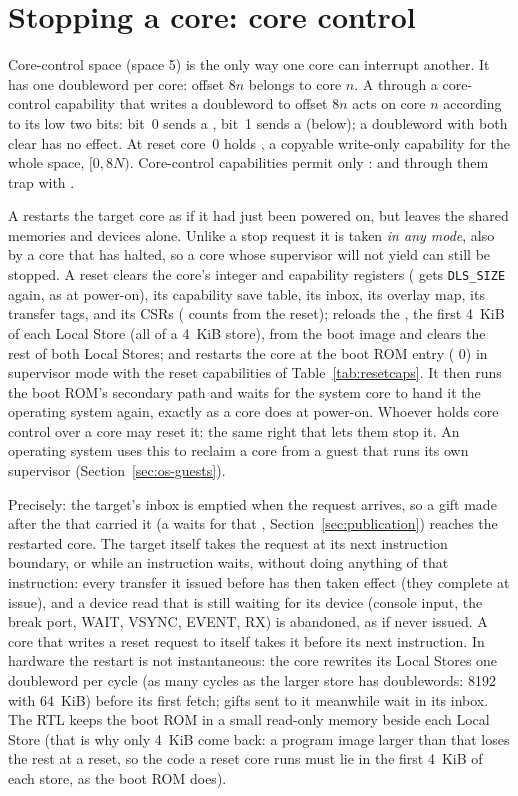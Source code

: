 \section{Stopping a core: core control}\label{sec:corectl}

Core-control space (space 5) is the only way one core can interrupt another. It has one doubleword per
core: offset $8n$ belongs to core $n$. A  through a core-control capability that writes a
doubleword to offset $8n$ acts on core $n$ according to its low two bits: bit~0 sends a , bit~1 sends a  (below); a doubleword with both clear has no effect. At
reset core~0 holds , a copyable write-only capability for the whole space, $[0, 8N)$.
Core-control capabilities permit only :  and  through them trap with
.

A  restarts the target core as if it had just been powered on, but leaves the
shared memories and devices alone. Unlike a stop request it is taken \emph{in any mode}, also by a
core that has halted, so a core whose supervisor will not yield can still be stopped. A reset clears
the core's integer and capability registers ( gets \texttt{DLS\_SIZE} again, as at power-on),
its capability save table, its inbox, its overlay map, its transfer tags, and its CSRs (
counts from the reset); reloads the , the first 4~KiB of each Local Store (all of a
4~KiB store), from the boot image and clears the rest of both Local Stores; and
restarts the core at the boot ROM entry ( 0) in supervisor mode with the reset capabilities of
Table~\ref{tab:resetcaps}. It then runs the boot ROM's secondary path and waits for the system core to
hand it the operating system again, exactly as a core does at power-on. Whoever holds core control
over a core may reset it: the same right that lets them stop it. An operating system uses this to
reclaim a core from a guest that runs its own supervisor (Section~\ref{sec:os-guests}).

Precisely: the target's inbox is emptied when the request arrives, so a gift made after the
 that carried it (a  waits for that , Section~\ref{sec:publication})
reaches the restarted core. The target itself takes the request at its next instruction boundary, or
while an instruction waits, without doing anything of that instruction: every transfer it issued
before has then taken effect (they complete at issue), and a device read that is still waiting for its
device (console input, the break port, WAIT, VSYNC, EVENT, RX) is abandoned, as if never issued. A
core that writes a reset request to itself takes it before its next instruction. In hardware the
restart is not instantaneous: the core rewrites its Local Stores one doubleword per cycle (as many
cycles as the larger store has doublewords: 8192 with 64~KiB) before its first fetch; gifts sent to it
meanwhile wait in its inbox. The RTL keeps
the boot ROM in a small read-only memory beside each Local Store (that is why only 4~KiB come back:
a program image larger than that loses the rest at a reset, so the code a reset core runs must lie in
the first 4~KiB of each store, as the boot ROM does).

